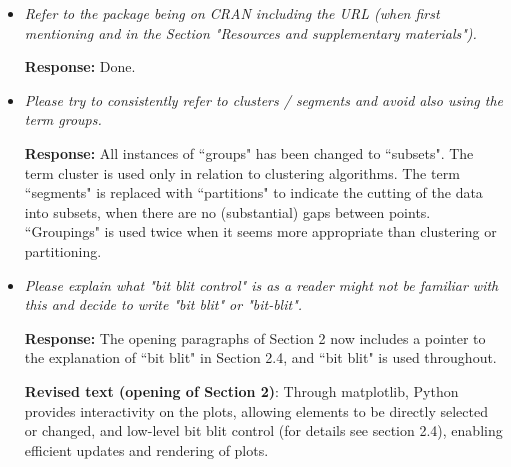 \documentclass[12pt]{article}
\begin{document}
\begin{itemize}
   \textbf{Added text}: Section 4 now starts with ``In this section, the Austrian Vacation Activities (Dolnicar and Leisch 2003), Australian Vacation Activities (Cliff 2009) and Tourist Risk Taking (Dolnicar 2017) datasets are analyzed with lionfish to illustrate the software’s capabilities. It has to be underlined that these analyses only serve as illustrative case studies and that the application of lionfish is not limited to market segmentation."
   
\subsection*{Further Comments}

	\item \textit{Refer to the package being on CRAN including the URL (when first mentioning and in the Section "Resources and supplementary materials").}

    \textbf{Response:} Done.
    
 	\item \textit{Please try to consistently refer to clusters / segments and avoid also using the term groups.}

    \textbf{Response:} All instances of ``groups" has been changed to ``subsets". The term cluster is used only in relation to clustering algorithms. The term ``segments" is replaced with ``partitions" to indicate the cutting of the data into subsets, when there are no (substantial) gaps between points. ``Groupings" is used twice when it seems more appropriate than clustering or partitioning.
    
	\item \textit{Please explain what "bit blit control" is as a reader might not be familiar with this and decide to write "bit blit" or "bit-blit".}

    \textbf{Response:} The opening paragraphs of Section 2 now includes a pointer to the explanation of ``bit blit" in Section 2.4, and ``bit blit" is used throughout.
    
    \textbf{Revised text (opening of Section 2)}: Through matplotlib, Python provides interactivity on the plots, allowing elements to be directly selected or changed, and low-level bit blit control (for details see section 2.4), enabling efficient updates and rendering of plots.


\end{itemize}
\end{document}
